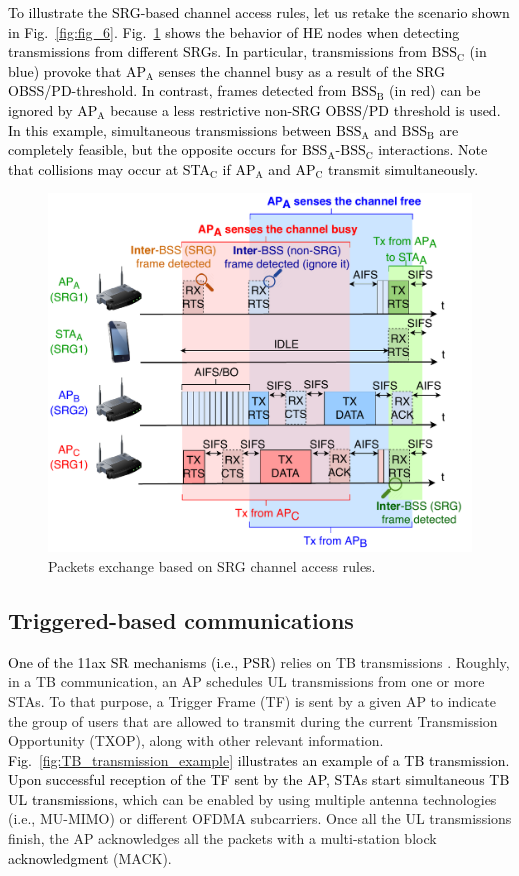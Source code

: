 \documentclass[preprint,12pt]{elsarticle}
\begin{document}
\textcolor{black}{To illustrate the SRG-based channel access rules, let us retake the scenario shown in Fig.~\ref{fig:fig_6}. Fig.~\ref{fig:srg_channel_access} shows the behavior of HE nodes when detecting transmissions from different SRGs. In particular, transmissions from $\text{BSS}_\text{C}$ (in blue) provoke that $\text{AP}_\text{A}$ senses the channel busy as a result of the SRG OBSS/PD-threshold. In contrast, frames detected from $\text{BSS}_\text{B}$ (in red) can be ignored by $\text{AP}_\text{A}$ because a less restrictive non-SRG OBSS/PD threshold is used. In this example, simultaneous transmissions between $\text{BSS}_\text{A}$ and $\text{BSS}_\text{B}$ are completely feasible, but the opposite occurs for $\text{BSS}_\text{A}$-$\text{BSS}_\text{C}$ interactions. Note that collisions may occur at STA$_\text{C}$ if $\text{AP}_\text{A}$ and $\text{AP}_\text{C}$ transmit simultaneously.}
\begin{figure}[ht!]
	\centering
	\includegraphics[width=.5\columnwidth]{fig_7}
	\caption{Packets exchange based on SRG channel access rules.}
	\label{fig:srg_channel_access}
\end{figure} 

\subsection{Triggered-based communications}
\label{section:tb_communication}
\textcolor{black}{One of the 11ax SR mechanisms (i.e., PSR)} relies on TB transmissions \cite{bellalta2019ap}. Roughly, in a TB communication, an AP schedules UL transmissions from one or more STAs. To that purpose, a Trigger Frame (TF) is sent by a given AP to indicate the group of users that are allowed to transmit during the current Transmission Opportunity (TXOP), along with other relevant information. \textcolor{black}{Fig.~\ref{fig:TB_transmission_example} illustrates an example of a TB transmission. Upon successful reception of the TF sent by the AP, STAs start simultaneous TB UL transmissions,} which can be enabled by using multiple antenna technologies (i.e., MU-MIMO) or different OFDMA subcarriers. Once all the UL transmissions finish, the AP acknowledges all the packets with a multi-station block \textcolor{black}{acknowledgment} (MACK).
\end{document}
